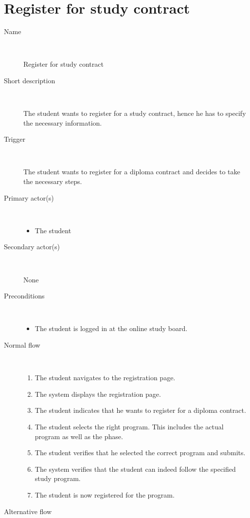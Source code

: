 \section{Register for study contract}

\begin{description}
	\item[Name] \
		\par Register for study contract
	\item[Short description] \ 
			\par The student wants to register for a study contract, hence he has to
			specify the necessary information.
	\item[Trigger] \ 
			\par The student wants to register for a diploma contract and decides to take
			the necessary steps.
	\item[Primary actor(s)] \ 
		\begin{itemize}
		  \item The student
		\end{itemize}
	\item[Secondary actor(s)] \ 
		\par None
	\item[Preconditions] \ 
	\begin{itemize}
		\item The student is logged in at the online study board.
	\end{itemize}
	\item[Normal flow] \ 
	\begin{enumerate}
	  	\item The student navigates to the registration page.
	  	\item The system displays the registration page.
	  	\item The student indicates that he wants to register for a diploma
	  	contract.
	  	\item The student selects the right program. This includes the actual
	  	program as well as the phase.
	  	\item The student verifies that he selected the correct program and submits.
	  	\item The system verifies that the student can indeed follow the specified
	  	study program.
	  	\item The student is now registered for the program.
	\end{enumerate}
	\item[Alternative flow] \

\end{description}
